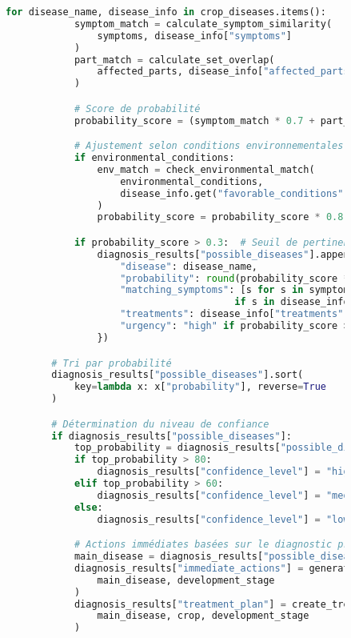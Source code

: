 \begin{figure}[H]
\begin{lstlisting}[language=Python, caption=Implémentation d'outils spécialisés pour l'agriculture]
        for disease_name, disease_info in crop_diseases.items():
            symptom_match = calculate_symptom_similarity(
                symptoms, disease_info["symptoms"]
            )
            part_match = calculate_set_overlap(
                affected_parts, disease_info["affected_parts"]
            )

            # Score de probabilité
            probability_score = (symptom_match * 0.7 + part_match * 0.3)

            # Ajustement selon conditions environnementales
            if environmental_conditions:
                env_match = check_environmental_match(
                    environmental_conditions,
                    disease_info.get("favorable_conditions", {})
                )
                probability_score = probability_score * 0.8 + env_match * 0.2

            if probability_score > 0.3:  # Seuil de pertinence
                diagnosis_results["possible_diseases"].append({
                    "disease": disease_name,
                    "probability": round(probability_score * 100, 1),
                    "matching_symptoms": [s for s in symptoms
                                        if s in disease_info["symptoms"]],
                    "treatments": disease_info["treatments"],
                    "urgency": "high" if probability_score > 0.7 else "medium"
                })

        # Tri par probabilité
        diagnosis_results["possible_diseases"].sort(
            key=lambda x: x["probability"], reverse=True
        )

        # Détermination du niveau de confiance
        if diagnosis_results["possible_diseases"]:
            top_probability = diagnosis_results["possible_diseases"][0]["probability"]
            if top_probability > 80:
                diagnosis_results["confidence_level"] = "high"
            elif top_probability > 60:
                diagnosis_results["confidence_level"] = "medium"
            else:
                diagnosis_results["confidence_level"] = "low"

            # Actions immédiates basées sur le diagnostic principal
            main_disease = diagnosis_results["possible_diseases"][0]
            diagnosis_results["immediate_actions"] = generate_immediate_actions(
                main_disease, development_stage
            )
            diagnosis_results["treatment_plan"] = create_treatment_plan(
                main_disease, crop, development_stage
            )


\end{lstlisting}
\end{figure}
